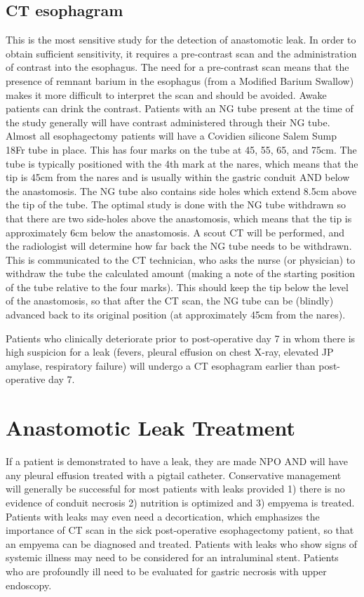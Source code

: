 \documentclass[
]{book}
\begin{document}
\hypertarget{ct_esophagram}{%
\subsection{CT esophagram}\label{ct_esophagram}}

This is the most sensitive study for the detection of anastomotic leak. In order to obtain sufficient sensitivity, it requires a pre-contrast scan and the administration of contrast into the esophagus. The need for a pre-contrast scan means that the presence of remnant barium in the esophagus (from a Modified Barium Swallow) makes it more difficult to interpret the scan and should be avoided. Awake patients can drink the contrast. Patients with an NG tube present at the time of the study generally will have contrast administered through their NG tube. Almost all esophagectomy patients will have a Covidien silicone Salem Sump 18Fr tube in place. This has four marks on the tube at 45, 55, 65, and 75cm. The tube is typically positioned with the 4th mark at the nares, which means that the tip is 45cm from the nares and is usually within the gastric conduit AND below the anastomosis. The NG tube also contains side holes which extend 8.5cm above the tip of the tube. The optimal study is done with the NG tube withdrawn so that there are two side-holes above the anastomosis, which means that the tip is approximately 6cm below the anastomosis. A scout CT will be performed, and the radiologist will determine how far back the NG tube needs to be withdrawn. This is communicated to the CT technician, who asks the nurse (or physician) to withdraw the tube the calculated amount (making a note of the starting position of the tube relative to the four marks). This should keep the tip below the level of the anastomosis, so that after the CT scan, the NG tube can be (blindly) advanced back to its original position (at approximately 45cm from the nares).

Patients who clinically deteriorate prior to post-operative day 7 in whom there is high suspicion for a leak (fevers, pleural effusion on chest X-ray, elevated JP amylase, respiratory failure) will undergo a CT esophagram earlier than post-operative day 7.

\hypertarget{anastomotic-leak-treatment}{%
\section{Anastomotic Leak Treatment}\label{anastomotic-leak-treatment}}

If a patient is demonstrated to have a leak, they are made NPO AND will have any pleural effusion treated with a pigtail catheter. Conservative management will generally be successful for most patients with leaks provided 1) there is no evidence of conduit necrosis 2) nutrition is optimized and 3) empyema is treated. Patients with leaks may even need a decortication, which emphasizes the importance of CT scan in the sick post-operative esophagectomy patient, so that an empyema can be diagnosed and treated. Patients with leaks who show signs of systemic illness may need to be considered for an intraluminal stent. Patients who are profoundly ill need to be evaluated for gastric necrosis with upper endoscopy.
\end{document}
